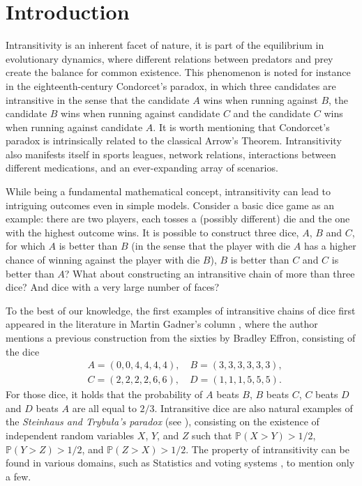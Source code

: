 \documentclass[reqno,a4paper,11pt]{amsart}
\theoremstyle{remark}
\newcommand{\bb}[1]{{\mathbb #1}}
\numberwithin{equation}{section}
\begin{document}
\maketitle

\tableofcontents
\allowdisplaybreaks

\section{Introduction}


Intransitivity is an inherent facet of nature, it is part of the equilibrium in evolutionary dynamics, where different relations between predators and prey create the balance for common existence. This phenomenon is noted for instance in the eighteenth-century Condorcet's paradox, in which three candidates are intransitive in the sense that the candidate $A$ wins when running against $B$, the candidate $B$ wins when running against candidate $C$ and the candidate $C$ wins when running against candidate $A$. It is worth mentioning that Condorcet's paradox is intrinsically related to the classical Arrow's Theorem. Intransitivity also manifests itself in sports leagues, network relations, interactions between different medications, and an ever-expanding array of scenarios.

While being a fundamental mathematical concept, intransitivity can lead to intriguing outcomes even in simple models. Consider a basic dice game as an example: there are two players, each tosses a (possibly different) die and the one with the highest outcome wins. It is possible to construct three dice, $ A $, $ B $ and $ C $, for which $ A $ is better than $ B $ (in the sense that the player with die $ A $ has a higher chance of winning against the player with die $ B $), $ B $ is better than $ C $ and $ C $ is better than $ A $?
What about constructing an intransitive chain of more than three dice? And dice with a very large number of faces?

To the best of our knowledge, the first examples of intransitive chains of dice first appeared in the literature in Martin Gadner's column \cite{Gardner}, where the author mentions a previous construction from the sixties by Bradley Effron, consisting of the dice
\begin{align*}
&A=(0, 0, 4, 4, 4, 4),\quad
B=(3, 3, 3, 3, 3, 3),\\
&C = (2, 2, 2, 2, 6, 6),\quad
D = (1, 1, 1, 5, 5, 5).
\end{align*}
For those dice, it holds that the probability of $A$ beats $B$, $B$ beats $C$, $C$ beats $D$ and $D$ beats $A$ are all equal to $2/3$. Intransitive dice are also natural	 examples of the
\textit{Steinhaus and Trybu{\l}a's paradox} (see \cite{Steinhaus, Lebedev}), consisting on the existence of independent random variables
$X$, $Y$, and $Z$ such that $\bb P(X > Y ) > 1/2$,
$\bb P(Y > Z ) > 1/2$, and $\bb P(Z > X ) > 1/2$.
The property of intransitivity can be found in various domains, such as Statistics \cite{Brown_Hett} and voting systems \cite{PTRF}, to mention only a few.
\end{document}
